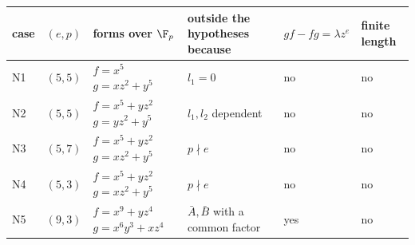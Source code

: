 \begin{tabular}{@{}ll>{\raggedright\arraybackslash}p{5.0cm}>{\raggedright\arraybackslash}p{3.0cm}ll@{}}
\toprule
case & $(e,p)$ & forms over $\F_p$ & outside the hypotheses because & $gf-fg=\lambda z^e$ & finite length\\
\midrule
N1 & $(5,5)$ & $f=x^{5}$\newline $g=xz^{2} + y^{5}$ & $l_1=0$ & no & no\\
N2 & $(5,5)$ & $f=x^{5} + yz^{2}$\newline $g=yz^{2} + y^{5}$ & $l_1,l_2$ dependent & no & no\\
N3 & $(5,7)$ & $f=x^{5} + yz^{2}$\newline $g=xz^{2} + y^{5}$ & $p\nmid e$ & no & no\\
N4 & $(5,3)$ & $f=x^{5} + yz^{2}$\newline $g=xz^{2} + y^{5}$ & $p\nmid e$ & no & no\\
N5 & $(9,3)$ & $f=x^{9} + yz^{4}$\newline $g=x^{6}y^{3} + xz^{4}$ & $\bar A,\bar B$ with a common factor & yes & no\\
\bottomrule
\end{tabular}
